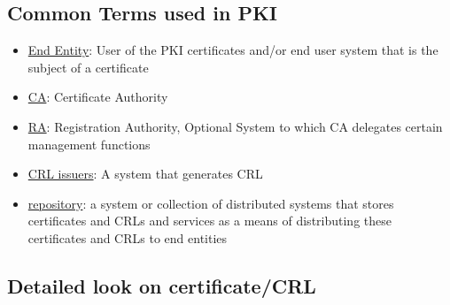 \documentclass[a4paper]{article}
\begin{document}
\subsection{Common Terms used in PKI}
\begin{itemize}
    \item \underline{End Entity}: User of the PKI certificates and/or end user system that is the subject of a certificate
    \item \underline{CA}: Certificate Authority
    \item \underline{RA}: Registration Authority, Optional System to which CA delegates certain management functions
    \item \underline{CRL issuers}: A system that generates CRL
    \item \underline{repository}: a system or collection of distributed systems that stores certificates and CRLs and services as a means of distributing these certificates and CRLs to end entities
\end{itemize}
\subsection{Detailed look on certificate/CRL}
\end{document}
